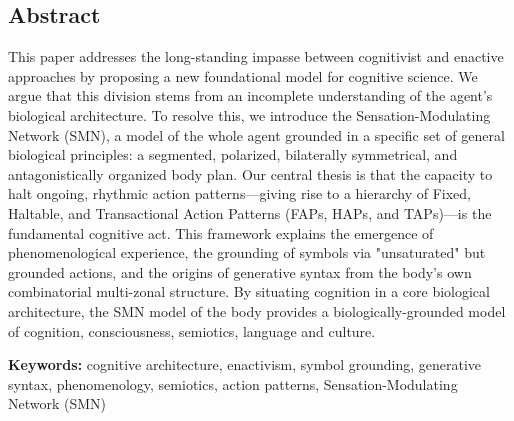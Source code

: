 \subsection*{Abstract}
This paper addresses the long-standing impasse between cognitivist and
enactive approaches by proposing a new foundational model for
cognitive science. We argue that this division stems from an
incomplete understanding of the agent's biological architecture. To
resolve this, we introduce the Sensation-Modulating Network (SMN), a
model of the whole agent grounded in a specific set of general
biological principles: a segmented, polarized, bilaterally
symmetrical, and antagonistically organized body plan. Our central
thesis is that the capacity to halt ongoing, rhythmic action
patterns—giving rise to a hierarchy of Fixed, Haltable, and
Transactional Action Patterns (FAPs, HAPs, and TAPs)—is the
fundamental cognitive act. This framework explains the emergence of
phenomenological experience, the grounding of symbols via
"unsaturated" but grounded actions, and the origins of generative
syntax from the body's own combinatorial multi-zonal structure. By
situating cognition in a core biological architecture, the SMN model
of the body provides a biologically-grounded model of cognition,
consciousness, semiotics, language and culture.

\bigskip
\noindent \textbf{Keywords:} cognitive architecture, enactivism, symbol grounding, generative syntax, phenomenology, semiotics, action patterns, Sensation-Modulating Network (SMN)
